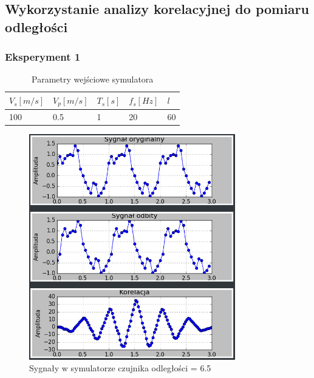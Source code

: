 \documentclass{article}
\begin{document}
    \subsection{Wykorzystanie analizy korelacyjnej do pomiaru odległości} {
        \subsubsection{Eksperyment 1} {
            \begin{table}[h!]
                \centering
                \begin{tabular}{|l|l|l|l|l|}
                    \hline
                    $V_s[m/s]$ & $V_p[m/s]$ & $T_s[s]$ & $f_s[Hz]$ & $l$ \\ \hline
                    100        & 0.5        & 1        & 20        & 60 \\ \hline
                \end{tabular}
                \caption{Parametry wejściowe symulatora}
            \end{table}
            \begin{figure}[h!]
                \centering
                \includegraphics[width=0.8\textwidth]{img/sim1.png}
                \caption{Sygnały w symulatorze czujnika odległości = 6.5}
            \end{figure}
            \begin{figure}[h!]
                \centering

\end{figure}}}
\end{document}
